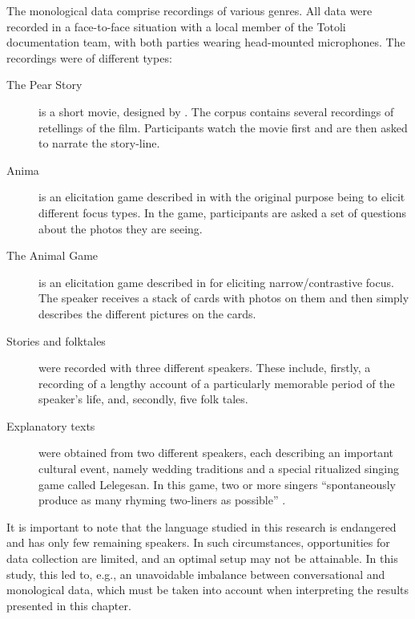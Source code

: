 The monological data comprise recordings of various genres. All data were recorded in a face-to-face situation with a local member of the Totoli documentation team, with both parties wearing head-mounted microphones. The recordings were of different types:


\begin{description}
	\item [The Pear Story] is a short movie, designed by \citet{chafe1980pear}.  The corpus contains several recordings of retellings of the film.  Participants watch the movie first and are then asked to narrate the story-line. 
	\item [Anima] is an elicitation game described in   \citet[99--107]{Skopeteas.2006b} with the original purpose being to elicit different focus types.  In the game, participants are asked a set of questions about the photos they are seeing. 
	\item [The Animal Game] is an elicitation game described in \citet[111--117]{Skopeteas.2006b} for eliciting narrow/contrastive focus.  
	The speaker receives a stack of cards with photos on them and then simply describes the different pictures on the cards. 
	\item [Stories and folktales]   were recorded with three different speakers. These include, firstly, a recording of a lengthy account of a particularly memorable period of the speaker’s life, and, secondly, five folk tales. 
	\item [Explanatory texts]  were obtained from two different speakers, each describing an important cultural event, namely wedding traditions and a special ritualized singing game called Lelegesan. In this game, two or more singers “spontaneously produce as many rhyming two-liners as possible”  \citep[83]{riesberg2019fern}.  
\end{description}










It is important to note that the language studied in this research is endangered    and has only few remaining speakers. In such circumstances, opportunities for data collection are limited, and an optimal  setup may not be attainable. In this study, this led to, e.g., an unavoidable imbalance between conversational and monological data, which must be taken into account when interpreting the results presented in this chapter.






